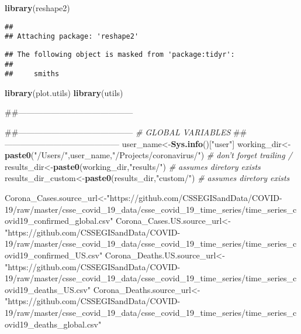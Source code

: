 \documentclass[]{article}
\newenvironment{Shaded}{\begin{snugshade}}{\end{snugshade}}
\newcommand{\KeywordTok}[1]{\textcolor[rgb]{0.13,0.29,0.53}{\textbf{{#1}}}}
\newcommand{\StringTok}[1]{\textcolor[rgb]{0.31,0.60,0.02}{{#1}}}
\newcommand{\CommentTok}[1]{\textcolor[rgb]{0.56,0.35,0.01}{\textit{{#1}}}}
\newcommand{\NormalTok}[1]{{#1}}
\begin{document}
\begin{Shaded}
\begin{Highlighting}[]
\KeywordTok{library}\NormalTok{(reshape2)}
\end{Highlighting}
\end{Shaded}

\begin{verbatim}
## 
## Attaching package: 'reshape2'
\end{verbatim}

\begin{verbatim}
## The following object is masked from 'package:tidyr':
## 
##     smiths
\end{verbatim}

\begin{Shaded}
\begin{Highlighting}[]
\KeywordTok{library}\NormalTok{(plot.utils)}
\KeywordTok{library}\NormalTok{(utils)}

\NormalTok{##------------------------------------------}

\NormalTok{##------------------------------------------}
\CommentTok{# GLOBAL VARIABLES}
\NormalTok{##------------------------------------------}
\NormalTok{user_name<-}\KeywordTok{Sys.info}\NormalTok{()[}\StringTok{"user"}\NormalTok{]}
\NormalTok{working_dir<-}\KeywordTok{paste0}\NormalTok{(}\StringTok{"/Users/"}\NormalTok{,user_name,}\StringTok{"/Projects/coronavirus/"}\NormalTok{) }\CommentTok{# don't forget trailing /}
\NormalTok{results_dir<-}\KeywordTok{paste0}\NormalTok{(working_dir,}\StringTok{"results/"}\NormalTok{) }\CommentTok{# assumes diretory exists}
\NormalTok{results_dir_custom<-}\KeywordTok{paste0}\NormalTok{(results_dir,}\StringTok{"custom/"}\NormalTok{) }\CommentTok{# assumes diretory exists}


\NormalTok{Corona_Cases.source_url<-}\StringTok{"https://github.com/CSSEGISandData/COVID-19/raw/master/csse_covid_19_data/csse_covid_19_time_series/time_series_covid19_confirmed_global.csv"}
\NormalTok{Corona_Cases.US.source_url<-}\StringTok{"https://github.com/CSSEGISandData/COVID-19/raw/master/csse_covid_19_data/csse_covid_19_time_series/time_series_covid19_confirmed_US.csv"}
\NormalTok{Corona_Deaths.US.source_url<-}\StringTok{"https://github.com/CSSEGISandData/COVID-19/raw/master/csse_covid_19_data/csse_covid_19_time_series/time_series_covid19_deaths_US.csv"}
\NormalTok{Corona_Deaths.source_url<-}\StringTok{"https://github.com/CSSEGISandData/COVID-19/raw/master/csse_covid_19_data/csse_covid_19_time_series/time_series_covid19_deaths_global.csv"}


\end{Highlighting}
\end{Shaded}
\end{document}
